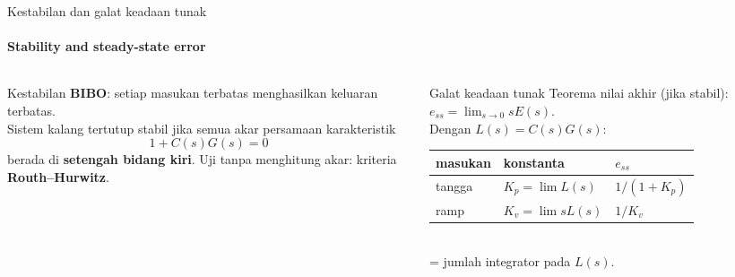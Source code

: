 \documentclass[aspectratio=169,10pt]{beamer}
\begin{document}
\begin{frame}{Kestabilan dan galat keadaan tunak}
	\framesubtitle{Stability and steady-state error}
	\begin{columns}[T]
		\begin{column}{0.48\textwidth}
			\begin{block}{Kestabilan}
				\small
				\textbf{BIBO}: setiap masukan terbatas menghasilkan keluaran terbatas.\\[3pt]
				Sistem kalang tertutup stabil jika semua akar persamaan karakteristik
				\[
					1 + C(s)G(s) = 0
				\]
				berada di \textbf{setengah bidang kiri}. Uji tanpa menghitung akar: kriteria \textbf{Routh--Hurwitz}.
			\end{block}
		\end{column}
		\begin{column}{0.48\textwidth}
			\begin{block}{Galat keadaan tunak}
				\small
				Teorema nilai akhir (jika stabil): $e_{ss} = \lim_{s\to 0} sE(s)$.\\[3pt]
				Dengan $L(s)=C(s)G(s)$:
				\renewcommand{\arraystretch}{1.3}
				\begin{tabular}{@{}l l l@{}}
					masukan & konstanta & $e_{ss}$ \\
					\midrule
					tangga & $K_p = \lim L(s)$ & $1/(1+K_p)$ \\
					ramp & $K_v = \lim sL(s)$ & $1/K_v$ \\
				\end{tabular}\\[3pt]
				 = jumlah integrator pada $L(s)$.
			\end{block}
		\end{column}
	\end{columns}
\end{frame}
\end{document}
